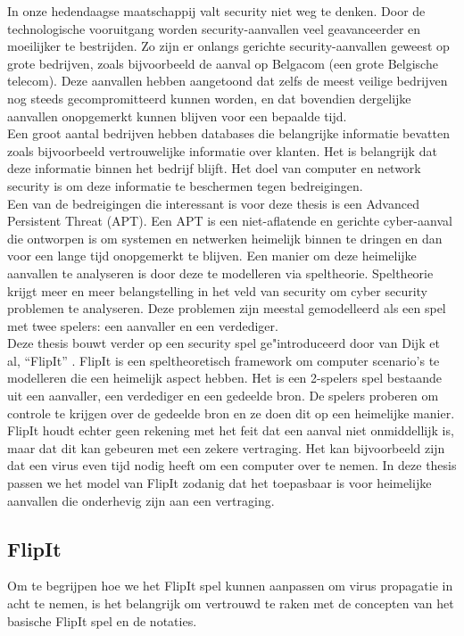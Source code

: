 \documentclass[master=cws, masteroption=vs,english]{kulemt}
\begin{document}
\begin{abstract*}
In onze hedendaagse maatschappij valt security niet weg te denken.  Door de technologische vooruitgang worden security-aanvallen veel geavanceerder en moeilijker te bestrijden. Zo zijn er onlangs gerichte security-aanvallen geweest op grote bedrijven, zoals bijvoorbeeld de aanval op Belgacom (een grote Belgische telecom). Deze aanvallen hebben aangetoond dat zelfs de meest veilige
bedrijven nog steeds gecompromitteerd kunnen worden, en dat bovendien dergelijke aanvallen onopgemerkt kunnen blijven voor een bepaalde tijd. \\

Een groot aantal bedrijven hebben databases die belangrijke informatie bevatten zoals bijvoorbeeld vertrouwelijke informatie over klanten. Het is belangrijk dat deze informatie binnen het bedrijf blijft. Het doel van computer en network security is om deze informatie te beschermen tegen bedreigingen. \\
Een van de bedreigingen die interessant is voor deze thesis is een Advanced Persistent Threat (APT). Een APT is een niet-aflatende en gerichte cyber-aanval die ontworpen is om systemen en netwerken heimelijk binnen te dringen en dan voor een lange tijd onopgemerkt te blijven. Een manier om deze heimelijke aanvallen te analyseren is door deze te modelleren via speltheorie. Speltheorie krijgt meer en meer belangstelling in het veld van security om cyber security problemen te analyseren. Deze problemen zijn meestal gemodelleerd als een spel met twee spelers: een aanvaller en een verdediger. \\

Deze thesis bouwt verder op een security spel ge"introduceerd door van Dijk et al, ``FlipIt'' \citep{FlipIt}.
FlipIt is een speltheoretisch framework om computer scenario's te modelleren die een heimelijk aspect hebben. Het is een 2-spelers spel bestaande uit een aanvaller, een verdediger en een gedeelde bron.  De spelers proberen om controle te krijgen over de gedeelde bron en ze
doen dit op een heimelijke manier. FlipIt houdt echter geen rekening met het feit dat een aanval niet onmiddellijk is, maar dat dit kan gebeuren met een zekere vertraging. Het kan bijvoorbeeld zijn dat een virus even tijd nodig heeft om een computer over te nemen. In deze thesis passen we het model van FlipIt zodanig dat het toepasbaar is voor heimelijke aanvallen die onderhevig zijn aan een vertraging.
 \\

\subsection{FlipIt}
Om te begrijpen hoe we het FlipIt spel kunnen aanpassen om virus propagatie in acht te nemen, is het belangrijk om vertrouwd te raken met de concepten van het basische FlipIt spel en de notaties.  \\


\end{abstract*}
\end{document}
